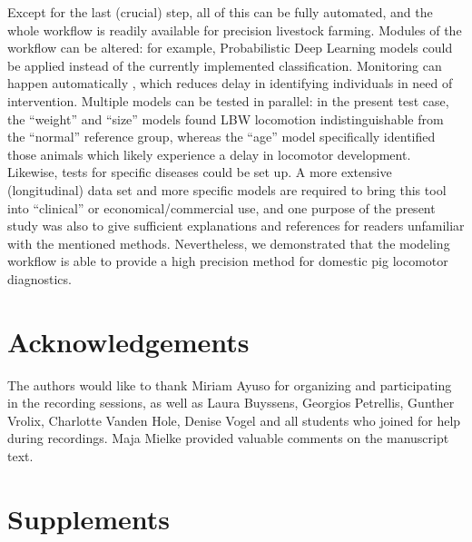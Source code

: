 \documentclass[10pt,a4paper]{article}
\begin{document}
Except for the last (crucial) step, all of this can be fully automated, and the whole workflow is readily available for precision livestock farming.
Modules of the workflow can be altered: for example, Probabilistic Deep Learning models could be applied instead of the currently implemented classification.
Monitoring can happen automatically \citep[as in][]{Litten2003,Netukova2021}, which reduces delay in identifying individuals in need of intervention.
Multiple models can be tested in parallel: in the present test case, the ``weight'' and ``size'' models found LBW locomotion indistinguishable from the ``normal'' reference group, whereas the ``age'' model specifically identified those animals which likely experience a delay in locomotor development.
Likewise, tests for specific diseases could be set up.
A more extensive (longitudinal) data set and more specific models are required to bring this tool into ``clinical'' or economical/commercial use, and one purpose of the present study was also to give sufficient explanations and references for readers unfamiliar with the mentioned methods.
Nevertheless, we demonstrated that the modeling workflow is able to provide a high precision method for domestic pig locomotor diagnostics.




\FloatBarrier
\clearpage
\section{Acknowledgements}
\label{sec:org2d8bfbc}
The authors would like to thank Miriam Ayuso for organizing and participating in the recording sessions, as well as Laura Buyssens, Georgios Petrellis, Gunther Vrolix, Charlotte Vanden Hole, Denise Vogel and all students who joined for help during recordings.
Maja Mielke provided valuable comments on the manuscript text.


\FloatBarrier
\clearpage
\beginsupplement
\section{Supplements}
\label{supplements}
\end{document}
